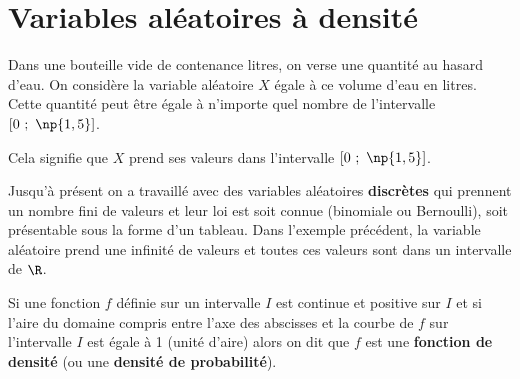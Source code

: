 \documentclass{cornouaille}
\begin{document}

\tableofcontents

\section{{Variables aléatoires à densité}{}}


\begin{exemple}
  Dans une bouteille vide de contenance  litres, on verse
  une quantité au hasard d'eau. On considère la variable aléatoire $X$
  égale à ce volume d'eau en litres. Cette quantité peut être égale à
  n'importe quel nombre de l'intervalle
  $\left[0\ ;\ \np{1,5} \right]$.

Cela signifie que $X$ prend ses valeurs dans l'intervalle $\left[0\ ;\ \np{1,5} \right]$.
\end{exemple}

\begin{remarque}
Jusqu'à présent on a travaillé avec des variables aléatoires \textbf{discrètes} qui prennent un nombre fini de valeurs et leur loi est soit connue (binomiale ou Bernoulli), soit présentable sous la forme d'un tableau. Dans l'exemple précédent, la variable aléatoire prend une infinité de valeurs et toutes ces valeurs sont dans un intervalle de $\R$.
\end{remarque}

\begin{definition}
  Si une fonction $f$ définie sur un intervalle $I$ est continue et
  positive sur $I$ et si l'aire du domaine compris entre l'axe des
  abscisses et la courbe de $f$ sur l'intervalle $I$ est égale à 1
  (unité d'aire) alors on dit que $f$ est une \textbf{fonction
    de densité}{} (ou une \textbf{densité de probabilité}{}).
\end{definition}
\end{document}
